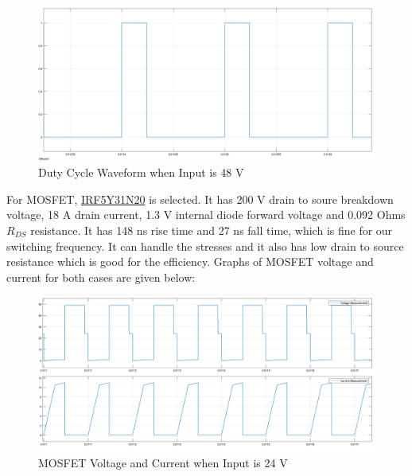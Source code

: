 \documentclass{article}
\newcommand\tab[1][1cm]{\hspace*{#1}}
\begin{document}
\begin{figure}[H]
    \centering
    \includegraphics[scale=0.2]{48v_duty.png}
    \caption{Duty Cycle Waveform when Input is 48 V}
    \label{fig:my_label}
\end{figure}

\tab For MOSFET, \href{http://www.irf.com/product-info/datasheets/data/irf5y31n20.pdf}{IRF5Y31N20} is selected. It has 200 V drain to soure breakdown voltage, 18 A drain current, 1.3 V internal diode forward voltage and 0.092 Ohms $R_{DS}$ resistance. It has 148 ns rise time and 27 ns fall time, which is fine for our switching frequency. It can handle the stresses and it also has low drain to source resistance which is good for the efficiency. Graphs of MOSFET voltage and current for both cases are given below:

\begin{figure}[H]
    \centering
    \includegraphics[scale=0.2]{24v_mosfet.png}
    \caption{MOSFET Voltage and Current when Input is 24 V}
    \label{fig:my_label}
\end{figure}
\end{document}

